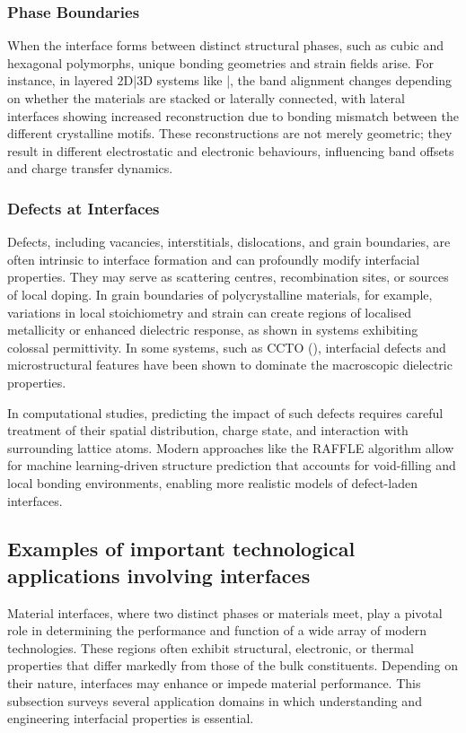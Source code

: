 \subsubsection{Phase Boundaries}

When the interface forms between distinct structural phases, such as cubic and hexagonal polymorphs, unique bonding geometries and strain fields arise. For instance, in layered 2D|3D systems like |, the band alignment changes depending on whether the materials are stacked or laterally connected, with lateral interfaces showing increased reconstruction due to bonding mismatch between the different crystalline motifs. These reconstructions are not merely geometric; they result in different electrostatic and electronic behaviours, influencing band offsets and charge transfer dynamics.

\subsubsection{Defects at Interfaces}

Defects, including vacancies, interstitials, dislocations, and grain boundaries, are often intrinsic to interface formation and can profoundly modify interfacial properties. They may serve as scattering centres, recombination sites, or sources of local doping. In grain boundaries of polycrystalline materials, for example, variations in local stoichiometry and strain can create regions of localised metallicity or enhanced dielectric response, as shown in systems exhibiting colossal permittivity. In some systems, such as CCTO (), interfacial defects and microstructural features have been shown to dominate the macroscopic dielectric properties.

In computational studies, predicting the impact of such defects requires careful treatment of their spatial distribution, charge state, and interaction with surrounding lattice atoms. Modern approaches like the RAFFLE algorithm allow for machine learning-driven structure prediction that accounts for void-filling and local bonding environments, enabling more realistic models of defect-laden interfaces.

\subsection{Examples of important technological applications involving interfaces}

Material interfaces, where two distinct phases or materials meet, play a pivotal role in determining the performance and function of a wide array of modern technologies. These regions often exhibit structural, electronic, or thermal properties that differ markedly from those of the bulk constituents. Depending on their nature, interfaces may enhance or impede material performance. This subsection surveys several application domains in which understanding and engineering interfacial properties is essential. 

